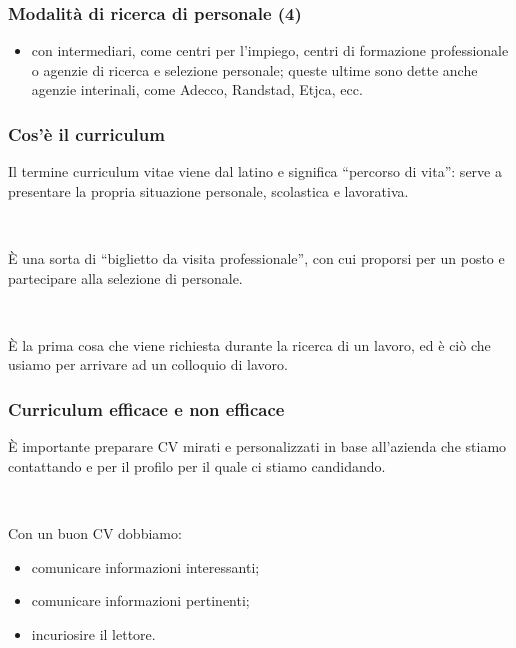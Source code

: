 \documentclass[handout]{beamer}
\begin{document}
\begin{frame}
\frametitle{Modalità di ricerca di personale (4)}
\begin{itemize}\setcounter{enumi}{1}
  \item con \alert{intermediari}, come centri per l'impiego, centri di formazione professionale o agenzie di ricerca e selezione personale;{\pause} queste ultime sono dette anche \alert{agenzie interinali}, come Adecco, Randstad, Etjca, ecc.
\end{itemize}
\end{frame}



\begin{frame}
\frametitle{Cos'è il curriculum}
Il termine \alert{curriculum vitae} viene dal latino e significa ``percorso di vita'': serve a presentare la propria situazione personale, scolastica e lavorativa.\pause

~

È una sorta di ``biglietto da visita professionale'', con cui proporsi per un posto e partecipare alla selezione di personale.\pause

~

È la prima cosa che viene richiesta durante la ricerca di un lavoro, ed è ciò che usiamo per \alert{arrivare ad un colloquio di lavoro}.
\end{frame}


\begin{frame}
\frametitle{Curriculum efficace e non efficace}
È importante preparare CV \alert{mirati e personalizzati} in base all'azienda che stiamo contattando e per il profilo per il quale ci stiamo candidando.\pause

~

Con un buon CV dobbiamo:
\begin{itemize}
  \item comunicare informazioni \alert{interessanti};\pause
  \item comunicare informazioni \alert{pertinenti};\pause
  \item \alert{incuriosire} il lettore.
\end{itemize}
\end{frame}
\end{document}
